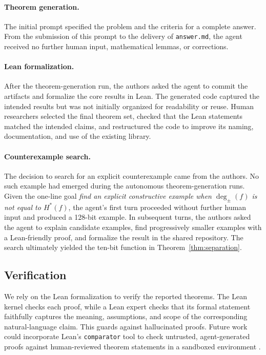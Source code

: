 \documentclass{article}
\theoremstyle{definition}
\theoremstyle{plain}
\newcommand{\hstar}{H^{\ast}}
\newcommand{\tdeg}{\deg_{\pm}}
\begin{document}
\paragraph{Theorem generation.}
The initial prompt specified the problem and the criteria for a complete answer. From the submission of this prompt to the delivery of \texttt{answer.md}, the agent received no further human input, mathematical lemmas, or corrections.

\paragraph{Lean formalization.}
After the theorem-generation run, the authors asked the agent to commit the artifacts and formalize the core results in Lean. The generated code captured the intended results but was not initially organized for readability or reuse. Human researchers selected the final theorem set, checked that the Lean statements matched the intended claims, and restructured the code to improve its naming, documentation, and use of the existing library.

\paragraph{Counterexample search.}
The decision to search for an explicit counterexample came from the authors. No such example had emerged during the autonomous theorem-generation runs. Given the one-line goal \emph{find an explicit constructive example when $\tdeg(f)$ is not equal to $\hstar(f)$}, the agent's first turn proceeded without further human input and produced a 128-bit example. In subsequent turns, the authors asked the agent to explain candidate examples, find progressively smaller examples with a Lean-friendly proof, and formalize the result in the shared repository. The search ultimately yielded the ten-bit function in Theorem~\ref{thm:separation}.

\subsection{Verification}


We rely on the Lean formalization to verify the reported theorems. The Lean kernel checks each proof, while a Lean expert checks that its formal statement faithfully captures the meaning, assumptions, and scope of the corresponding natural-language claim. This guards against hallucinated proofs. Future work could incorporate Lean's \texttt{comparator} tool to check untrusted, agent-generated proofs against human-reviewed theorem statements in a sandboxed environment \citep{leanfro2026comparator}.
\end{document}
